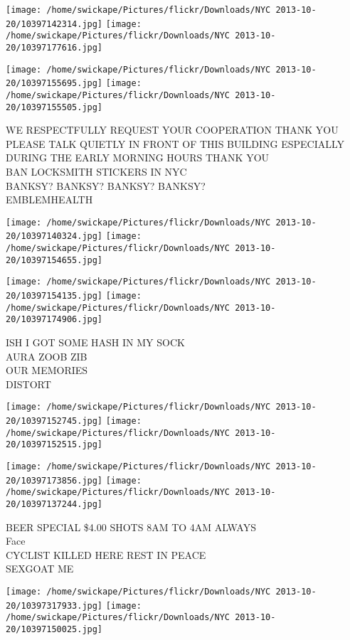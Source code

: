 \documentclass[10pt,letterpaper]{article}
\begin{document}
\texttt{[image: /home/swickape/Pictures/flickr/Downloads/NYC 2013-10-20/10397142314.jpg]}
\texttt{[image: /home/swickape/Pictures/flickr/Downloads/NYC 2013-10-20/10397177616.jpg]}

\texttt{[image: /home/swickape/Pictures/flickr/Downloads/NYC 2013-10-20/10397155695.jpg]}
\texttt{[image: /home/swickape/Pictures/flickr/Downloads/NYC 2013-10-20/10397155505.jpg]}

WE RESPECTFULLY REQUEST YOUR COOPERATION THANK YOU PLEASE TALK QUIETLY IN FRONT OF THIS BUILDING ESPECIALLY DURING THE EARLY MORNING HOURS THANK YOU\\
BAN LOCKSMITH STICKERS IN NYC\\
BANKSY? BANKSY? BANKSY? BANKSY?\\
EMBLEMHEALTH\\
\pagebreak

\texttt{[image: /home/swickape/Pictures/flickr/Downloads/NYC 2013-10-20/10397140324.jpg]}
\texttt{[image: /home/swickape/Pictures/flickr/Downloads/NYC 2013-10-20/10397154655.jpg]}

\texttt{[image: /home/swickape/Pictures/flickr/Downloads/NYC 2013-10-20/10397154135.jpg]}
\texttt{[image: /home/swickape/Pictures/flickr/Downloads/NYC 2013-10-20/10397174906.jpg]}

ISH I GOT SOME HASH IN MY SOCK\\
AURA ZOOB ZIB\\
OUR MEMORIES\\
DISTORT\\
\pagebreak

\texttt{[image: /home/swickape/Pictures/flickr/Downloads/NYC 2013-10-20/10397152745.jpg]}
\texttt{[image: /home/swickape/Pictures/flickr/Downloads/NYC 2013-10-20/10397152515.jpg]}

\texttt{[image: /home/swickape/Pictures/flickr/Downloads/NYC 2013-10-20/10397173856.jpg]}
\texttt{[image: /home/swickape/Pictures/flickr/Downloads/NYC 2013-10-20/10397137244.jpg]}

BEER SPECIAL \$4.00 SHOTS 8AM TO 4AM ALWAYS\\
Face\\
CYCLIST KILLED HERE REST IN PEACE\\
SEXGOAT ME\\
\pagebreak

\texttt{[image: /home/swickape/Pictures/flickr/Downloads/NYC 2013-10-20/10397317933.jpg]}
\texttt{[image: /home/swickape/Pictures/flickr/Downloads/NYC 2013-10-20/10397150025.jpg]}
\end{document}
